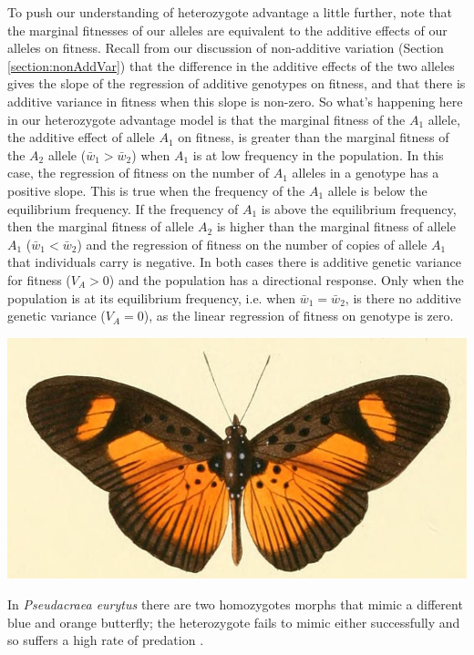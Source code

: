 To push our understanding of heterozygote advantage a little further, note that the marginal fitnesses of our alleles are equivalent to the additive effects of our alleles on fitness. Recall from our discussion of non-additive variation (Section \ref{section:nonAddVar}) that the difference in the additive effects of the two alleles gives the slope of the regression of additive genotypes on fitness, and that there is additive variance in fitness
when this slope is non-zero.  
So what's happening here in our heterozygote advantage model is that the marginal fitness of the $A_1$ allele, the additive effect of allele $A_1$ on fitness, is greater than the marginal fitness of the $A_2$ allele ($\bar{w}_1 > \bar{w}_2 $) when $A_1$ is at low frequency in the population. In this case, the regression of fitness on the number of $A_1$ alleles in a genotype has a positive slope. This is true when the
frequency of the $A_1$ allele is below the equilibrium frequency. If the frequency of $A_1$ is above the equilibrium frequency, then
the marginal fitness of allele $A_2$ is higher than the marginal fitness of allele $A_1$ ($\bar{w}_1 < \bar{w}_2 $) and the regression of fitness on the number of copies of allele $A_1$ that individuals carry is negative. In both cases there is additive genetic variance for fitness ($V_A > 0$) and the population has a directional response. Only when the population is at its equilibrium frequency, i.e. when $\bar{w}_1 =
\bar{w}_2$, is there no additive genetic variance  ($V_A = 0$), as the linear regression of fitness on genotype is zero. 
\begin{marginfigure}[-0.5cm]
\begin{center}
  \includegraphics[width = \textwidth]{illustration_images/single_locus_selection/Pseudacraea_eurytus/Pseudacraea_eurytus.JPG}
\end{center}
\caption{In {\it Pseudacraea eurytus} there are two homozygotes morphs that mimic
 a different blue and orange butterfly; the heterozygote fails to mimic
either successfully and so suffers a high rate of predation
\citep{owen1972polymorphic}. } \label{fig:underdom_buttfly}  %
\end{marginfigure}



